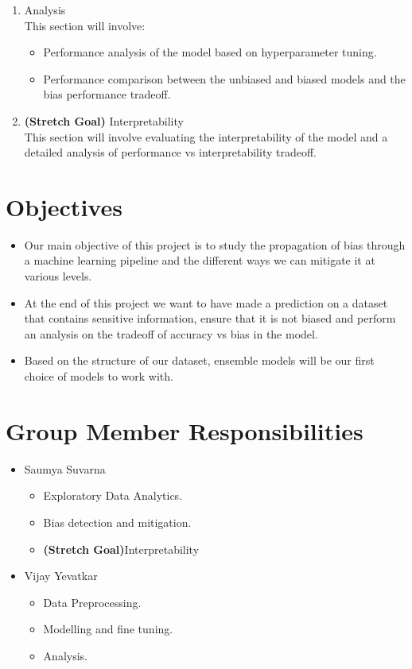 \documentclass{article}
\begin{document}
\begin{enumerate}
\begin{itemize}
        \end{itemize}
    \item Analysis\\
    This section will involve:
        \begin{itemize}
            \item Performance analysis of the model based on hyperparameter tuning.
            \item Performance comparison between the unbiased and biased models and the bias performance tradeoff.
        \end{itemize}
    \item \textbf{(Stretch Goal)} Interpretability\\
    This section will involve evaluating the interpretability of the model and a detailed analysis of performance vs interpretability tradeoff.
\end{enumerate}

\section{Objectives}
\begin{itemize}
    \item Our main objective of this project is to study the propagation of bias through a machine learning pipeline and the different ways we can mitigate it at various levels.
    \item At the end of this project we want to have made a prediction on a dataset that contains sensitive information, ensure that it is not biased and perform an analysis on the tradeoff of accuracy vs bias in the model.
    \item Based on the structure of our dataset, ensemble models will be our first choice of models to work with.
\end{itemize}

\section{Group Member Responsibilities}
\begin{multicols}{2}
\begin{itemize}
    \item Saumya Suvarna
    \begin{itemize}
        \item Exploratory Data Analytics.
        \item Bias detection and mitigation.
        \item \textbf{(Stretch Goal)}Interpretability
    \end{itemize}
    \item Vijay Yevatkar
    \begin{itemize}
        \item Data Preprocessing.
        \item Modelling and fine tuning.
        \item Analysis.
    \end{itemize}
\end{itemize}
\end{multicols}
\end{document}
